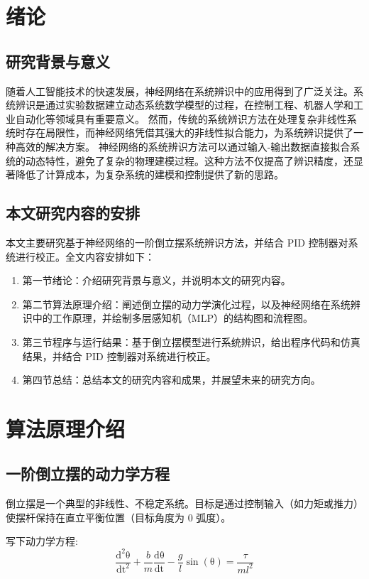 \documentclass[12pt, AutoFakeBold=4]{ctexart}
\begin{document}
	\thispagestyle{empty}
	\maketitle
	\tableofcontents
	\newpage
	\section{绪论}
	\subsection{研究背景与意义}
随着人工智能技术的快速发展，神经网络在系统辨识中的应用得到了广泛关注。系统辨识是通过实验数据建立动态系统数学模型的过程，在控制工程、机器人学和工业自动化等领域具有重要意义。\cite{ai_book1}
然而，传统的系统辨识方法在处理复杂非线性系统时存在局限性，而神经网络凭借其强大的非线性拟合能力，为系统辨识提供了一种高效的解决方案。
神经网络的系统辨识方法可以通过输入-输出数据直接拟合系统的动态特性，避免了复杂的物理建模过程。这种方法不仅提高了辨识精度，还显著降低了计算成本，为复杂系统的建模和控制提供了新的思路。

\subsection{本文研究内容的安排}
本文主要研究基于神经网络的一阶倒立摆系统辨识方法，并结合 PID 控制器对系统进行校正。全文内容安排如下：
\begin{enumerate}
    \item 第一节绪论：介绍研究背景与意义，并说明本文的研究内容。
    \item 第二节算法原理介绍：阐述倒立摆的动力学演化过程，以及神经网络在系统辨识中的工作原理，并绘制多层感知机（MLP）的结构图和流程图。
    \item 第三节程序与运行结果：基于倒立摆模型进行系统辨识，给出程序代码和仿真结果，并结合 PID 控制器对系统进行校正。
    \item 第四节总结：总结本文的研究内容和成果，并展望未来的研究方向。
\end{enumerate}

\newpage

	\section{算法原理介绍}
		\subsection{一阶倒立摆的动力学方程}
	倒立摆是一个典型的非线性、不稳定系统。目标是通过控制输入（如力矩或推力）使摆杆保持在直立平衡位置（目标角度为 0 弧度）。
	
	写下动力学方程:
	\begin{equation}
		\frac{\mathrm{d^2\theta}}{\mathrm{dt^2}}+\frac{b}{m}\frac{\mathrm{d\theta}}{\mathrm{dt}}-\frac{g}{l}\mathrm{\sin(\theta)}=\frac{\tau}{m l^2}
	\end{equation}
	\par
	
\end{document}
